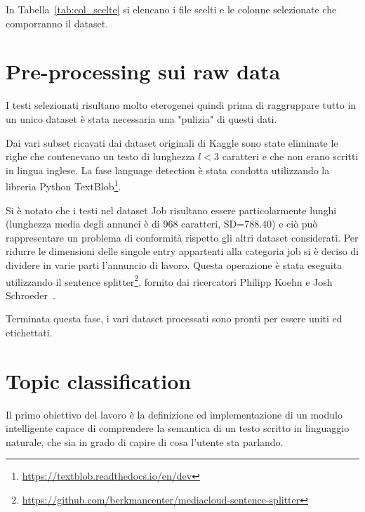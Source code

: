 In Tabella~\ref{tab:col_scelte} si elencano i file scelti e le colonne selezionate che comporranno il dataset.

\section{Pre-processing sui raw data}
\label{sec:preprocessingraw}
I testi selezionati risultano molto eterogenei quindi prima di raggruppare tutto in un unico dataset è stata necessaria una "pulizia" di questi dati.

Dai vari subset ricavati dai dataset originali di Kaggle sono state eliminate le righe che contenevano un testo di lunghezza $l<3$ caratteri e che non erano scritti in lingua inglese. La fase language detection è stata condotta utilizzando la libreria Python  TextBlob\footnote{\url{https://textblob.readthedocs.io/en/dev}}.

Si è notato che i testi nel dataset Job risultano essere particolarmente lunghi (lunghezza media degli annunci è di 968 caratteri, SD=788.40) e ciò può rappresentare un problema di conformità rispetto gli altri dataset considerati. Per ridurre le dimensioni delle singole entry appartenti alla categoria job si è deciso di dividere in varie parti l'annuncio di lavoro. Questa operazione è stata eseguita utilizzando il sentence splitter\footnote{\url{https://github.com/berkmancenter/mediacloud-sentence-splitter}}, fornito dai ricercatori Philipp Koehn e Josh Schroeder~\cite{Koehn07}. 

Terminata questa fase, i vari dataset processati sono pronti per essere uniti ed etichettati.

\section{Topic classification}
\label{sec:topicclass}
Il primo obiettivo del lavoro è la definizione ed implementazione di un modulo intelligente capace di comprendere la semantica di un testo scritto in linguaggio naturale, che sia in grado di capire di cosa l'utente sta parlando.

